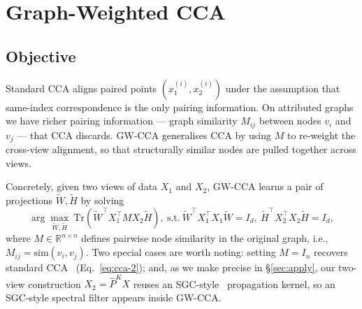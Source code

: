 \documentclass{article}
\begin{document}
\section{Graph-Weighted CCA}
\label{sec:approach}

\subsection{Objective}
\label{sec:approach:objective}

Standard CCA aligns paired points $(x_1^{(i)}, x_2^{(i)})$ under the
assumption that same-index correspondence is the only pairing information.
On attributed graphs we have richer pairing information --- graph similarity
$M_{ij}$ between nodes $v_i$ and $v_j$ --- that CCA discards. GW-CCA
generalises CCA by using $M$ to re-weight the cross-view alignment, so that
structurally similar nodes are pulled together across views.

Concretely, given two views of data $X_1$ and $X_2$, GW-CCA learns a pair of
projections $\widetilde{W}, \widetilde{H}$ by solving
\begin{equation}\label{eq:gcca}
\arg\max_{\widetilde{W}, \widetilde{H}}\ \mathrm{Tr}(\widetilde{W}^\top X_1^\top M X_2 \widetilde{H}),\
\text{s.t.}\ \widetilde{W}^\top X_1^\top X_1 \widetilde{W} = I_d,\ \widetilde{H}^\top X_2^\top X_2 \widetilde{H} = I_d,
\end{equation}
where $M \in \mathbb{R}^{n\times n}$ defines pairwise node similarity in the
original graph, i.e., $M_{ij} = \mathrm{sim}(v_i, v_j)$. Two special cases
are worth noting: setting $M = I_n$ recovers standard
CCA~\citep{hotelling1992relations} (Eq.~\ref{eq:cca-2}); and, as we make
precise in \S\ref{sec:apply}, our two-view construction
$X_2 = \widehat{P}^K X$ reuses an SGC-style~\citep{wu2019simplifying}
propagation kernel, so an SGC-style spectral filter appears inside GW-CCA.
\end{document}
